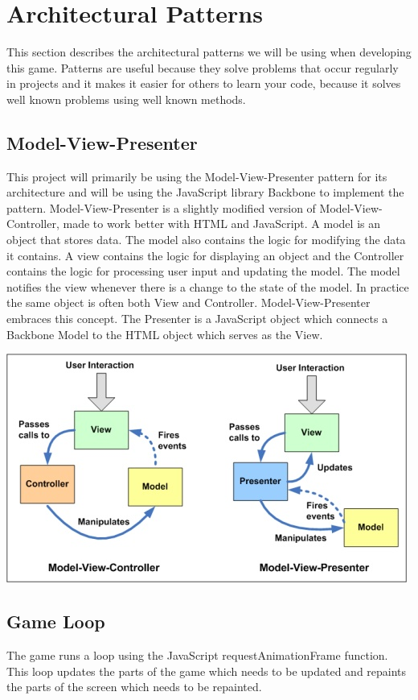 \section{Architectural Patterns}
This section describes the architectural patterns we will be using when developing this game. Patterns
are useful because they solve problems that occur regularly in projects and it makes it easier for 
others to learn your code, because it solves well known problems using well known methods.

\subsection*{Model-View-Presenter}
This project will primarily be using the Model-View-Presenter pattern for its architecture and will 
be using the JavaScript library Backbone to implement the pattern. Model-View-Presenter is a slightly
modified version of Model-View-Controller, made to work better with HTML and JavaScript. A model is 
an object that stores data. The model also contains the logic for modifying the data it contains. 
A view contains the logic for displaying an object and the Controller contains the logic for 
processing user input and updating the model. The model notifies the view whenever there is a change
to the state of the model. In practice the same object is often both View and Controller. 
Model-View-Presenter embraces this concept. The Presenter is a JavaScript object which connects a 
Backbone Model to the HTML object which serves as the View. 
\cite{mvp}

\includegraphics{pictures/mvc_mvp}

\subsection*{Game Loop}
The game runs a loop using the JavaScript requestAnimationFrame function. This loop updates the parts 
of the game which needs to be updated and repaints the parts of the screen which needs to be repainted.

